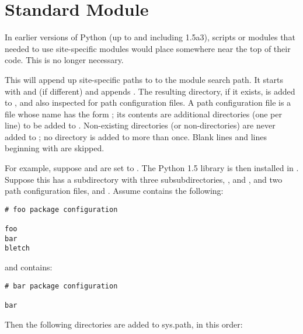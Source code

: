 \section{Standard Module }
\label{module-site}


In earlier versions of Python (up to and including 1.5a3), scripts or
modules that needed to use site-specific modules would place
 somewhere near the top of their code.  This is no
longer necessary.

This will append up site-specific paths to to the module search path.
It starts with  and  (if
different) and appends .  The
resulting directory, if it exists, is added to , and
also inspected for path configuration files.  A path configuration
file is a file whose name has the form ; its
contents are additional directories (one per line) to be added to
.  Non-existing directories (or non-directories) are
never added to ; no directory is added to
 more than once.  Blank lines and lines beginning with
\code{\#} are skipped.

For example, suppose  and  are
set to .  The Python 1.5 library is then installed in
.  Suppose this has a subdirectory
 with three subsubdirectories,
,  and , and two path configuration
files,  and .  Assume 
contains the following:

\bcode\begin{verbatim}
# foo package configuration

foo
bar
bletch
\end{verbatim}\ecode

and  contains:

\bcode\begin{verbatim}
# bar package configuration

bar
\end{verbatim}\ecode

Then the following directories are added to sys.path, in this order:

